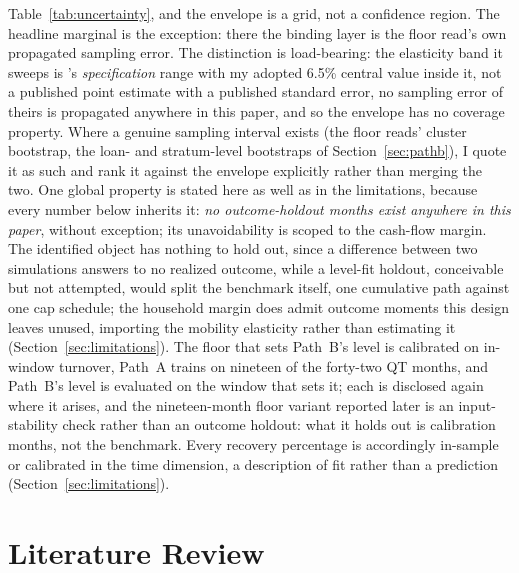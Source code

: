 \documentclass[12pt]{article}
\begin{document}
Table~\ref{tab:uncertainty}, and the envelope is a grid, not a confidence region. The headline marginal is the exception: there the binding layer is the floor read's own propagated sampling error. The distinction is load-bearing: the elasticity band it sweeps is \citeauthor{liebersohn2024}'s \emph{specification} range with my adopted 6.5\% central value inside it, not a published point estimate with a published standard error, no sampling error of theirs is propagated anywhere in this paper, and so the envelope has no coverage property. Where a genuine sampling interval exists (the floor reads' cluster bootstrap, the loan- and stratum-level bootstraps of Section~\ref{sec:pathb}), I quote it as such and rank it against the envelope explicitly rather than merging the two. One global property is stated here as well as in the limitations, because every number below inherits it: \emph{no outcome-holdout months exist anywhere in this paper}, without exception; its unavoidability is scoped to the cash-flow margin. The identified object has nothing to hold out, since a difference between two simulations answers to no realized outcome, while a level-fit holdout, conceivable but not attempted, would split the benchmark itself, one cumulative path against one cap schedule; the household margin does admit outcome moments this design leaves unused, importing the mobility elasticity rather than estimating it (Section~\ref{sec:limitations}). The floor that sets Path~B's level is calibrated on in-window turnover, Path~A trains on nineteen of the forty-two QT months, and Path~B's level is evaluated on the window that sets it; each is disclosed again where it arises, and the nineteen-month floor variant reported later is an input-stability check rather than an outcome holdout: what it holds out is calibration months, not the benchmark. Every recovery percentage is accordingly in-sample or calibrated in the time dimension, a description of fit rather than a prediction (Section~\ref{sec:limitations}).

\section{Literature Review}\label{sec:lit}
\end{document}
